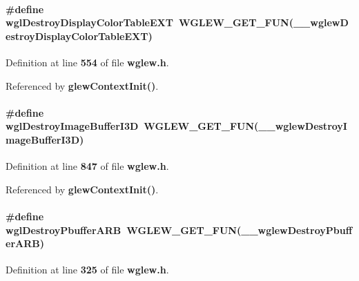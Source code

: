 \paragraph[{wgl\+Destroy\+Display\+Color\+Table\+E\+XT}]{\setlength{\rightskip}{0pt plus 5cm}\#define wgl\+Destroy\+Display\+Color\+Table\+E\+XT~{\bf W\+G\+L\+E\+W\+\_\+\+G\+E\+T\+\_\+\+F\+UN}({\bf \+\_\+\+\_\+wglew\+Destroy\+Display\+Color\+Table\+E\+XT})}\label{wglew_8h_a34c045eb9557031fe4639025a7d1798a}


Definition at line {\bf 554} of file {\bf wglew.\+h}.



Referenced by {\bf glew\+Context\+Init()}.

\paragraph[{wgl\+Destroy\+Image\+Buffer\+I3D}]{\setlength{\rightskip}{0pt plus 5cm}\#define wgl\+Destroy\+Image\+Buffer\+I3D~{\bf W\+G\+L\+E\+W\+\_\+\+G\+E\+T\+\_\+\+F\+UN}({\bf \+\_\+\+\_\+wglew\+Destroy\+Image\+Buffer\+I3D})}\label{wglew_8h_af6275fe7f80a5c3a772279758ac99577}


Definition at line {\bf 847} of file {\bf wglew.\+h}.



Referenced by {\bf glew\+Context\+Init()}.

\paragraph[{wgl\+Destroy\+Pbuffer\+A\+RB}]{\setlength{\rightskip}{0pt plus 5cm}\#define wgl\+Destroy\+Pbuffer\+A\+RB~{\bf W\+G\+L\+E\+W\+\_\+\+G\+E\+T\+\_\+\+F\+UN}({\bf \+\_\+\+\_\+wglew\+Destroy\+Pbuffer\+A\+RB})}\label{wglew_8h_a9f08c595b107bbf053b2551b18260416}


Definition at line {\bf 325} of file {\bf wglew.\+h}.



